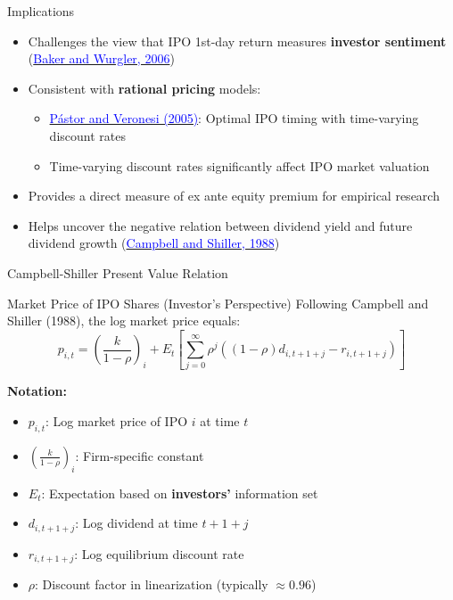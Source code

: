 \documentclass{beamer}
\begin{document}
\begin{frame}{Implications}
\begin{itemize}
    \item Challenges the view that IPO 1st-day return measures \textbf{investor sentiment} (\href{https://doi.org/10.1111/j.1540-6261.2006.00885.x}{\textcolor{blue}{Baker and Wurgler, 2006}})
    
    \item Consistent with \textbf{rational pricing} models:
    \begin{itemize}
        \item \href{https://doi.org/10.1111/j.1540-6261.2005.00778.x}{\textcolor{blue}{Pástor and Veronesi (2005)}}: Optimal IPO timing with time-varying discount rates
        \item Time-varying discount rates significantly affect IPO market valuation
    \end{itemize}
    
    \item Provides a direct measure of ex ante equity premium for empirical research

    \item Helps uncover the negative relation between dividend yield and future dividend growth (\href{https://doi.org/10.1093/rfs/1.3.195}{\textcolor{blue}{Campbell and Shiller, 1988}})
\end{itemize}
\end{frame}


\begin{frame}{Campbell-Shiller Present Value Relation}
\begin{block}{Market Price of IPO Shares (Investor's Perspective)}
Following Campbell and Shiller (1988), the log market price equals:
\[
p_{i,t} = \left(\frac{k}{1-\rho}\right)_i + E_t\left[\sum_{j=0}^{\infty}\rho^j\left((1-\rho)d_{i,t+1+j} - r_{i,t+1+j}\right)\right]
\]
\end{block}

\textbf{Notation:}
\begin{itemize}
    \item $p_{i,t}$: Log market price of IPO $i$ at time $t$
    \item $\left(\frac{k}{1-\rho}\right)_i$: Firm-specific constant
    \item $E_t$: Expectation based on \textbf{investors'} information set
    \item $d_{i,t+1+j}$: Log dividend at time $t+1+j$
    \item $r_{i,t+1+j}$: Log equilibrium discount rate
    \item $\rho$: Discount factor in linearization (typically $\approx 0.96$)
\end{itemize}
\end{frame}
\end{document}
